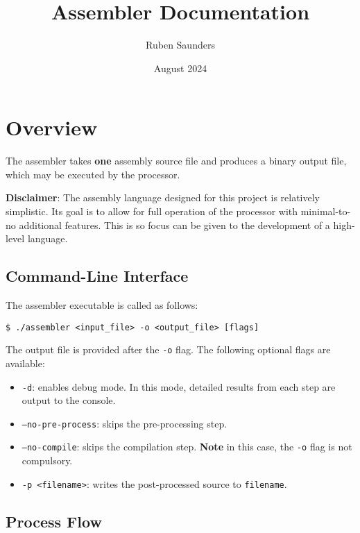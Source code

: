 \documentclass{article}
\title{Assembler Documentation}
\author{Ruben Saunders}
\date{August 2024}
\begin{document}
\maketitle
\tableofcontents

\newpage

\section{Overview}

The assembler takes \textbf{one} assembly source file and produces a binary output file, which may be executed by the processor.

\textbf{Disclaimer}: The assembly language designed for this project is relatively simplistic.
Its goal is to allow for full operation of the processor with minimal-to-no additional features.
This is so focus can be given to the development of a high-level language.

\subsection{Command-Line Interface}

The assembler executable is called as follows:

\medskip
\begin{lstlisting}[style=bashconsole]
$ ./assembler <input_file> -o <output_file> [flags]
\end{lstlisting}

The output file is provided after the \texttt{-o} flag.
The following optional flags are available:
\begin{itemize}
    \item \texttt{-d}: enables debug mode.
    In this mode, detailed results from each step are output to the console.
    \item \texttt{--no-pre-process}: skips the pre-processing step.
    \item \texttt{--no-compile}: skips the compilation step.
    \textbf{Note} in this case, the \texttt{-o} flag is not compulsory.
    \item \texttt{-p <filename>}: writes the post-processed source to \texttt{filename}.
\end{itemize}

\subsection{Process Flow}
\end{document}
